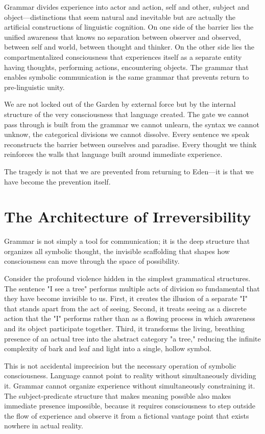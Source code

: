Grammar divides experience into actor and action, self and other, subject and object—distinctions that seem natural and inevitable but are actually the artificial constructions of linguistic cognition. On one side of the barrier lies the unified awareness that knows no separation between observer and observed, between self and world, between thought and thinker. On the other side lies the compartmentalized consciousness that experiences itself as a separate entity having thoughts, performing actions, encountering objects. The grammar that enables symbolic communication is the same grammar that prevents return to pre-linguistic unity.

We are not locked out of the Garden by external force but by the internal structure of the very consciousness that language created. The gate we cannot pass through is built from the grammar we cannot unlearn, the syntax we cannot unknow, the categorical divisions we cannot dissolve. Every sentence we speak reconstructs the barrier between ourselves and paradise. Every thought we think reinforces the walls that language built around immediate experience.

The tragedy is not that we are prevented from returning to Eden—it is that we have become the prevention itself.

\section{The Architecture of Irreversibility}

Grammar is not simply a tool for communication; it is the deep structure that organizes all symbolic thought, the invisible scaffolding that shapes how consciousness can move through the space of possibility.

Consider the profound violence hidden in the simplest grammatical structures. The sentence "I see a tree" performs multiple acts of division so fundamental that they have become invisible to us. First, it creates the illusion of a separate "I" that stands apart from the act of seeing. Second, it treats seeing as a discrete action that the "I" performs rather than as a flowing process in which awareness and its object participate together. Third, it transforms the living, breathing presence of an actual tree into the abstract category "a tree," reducing the infinite complexity of bark and leaf and light into a single, hollow symbol.

This is not accidental imprecision but the necessary operation of symbolic consciousness. Language cannot point to reality without simultaneously dividing it. Grammar cannot organize experience without simultaneously constraining it. The subject-predicate structure that makes meaning possible also makes immediate presence impossible, because it requires consciousness to step outside the flow of experience and observe it from a fictional vantage point that exists nowhere in actual reality.

